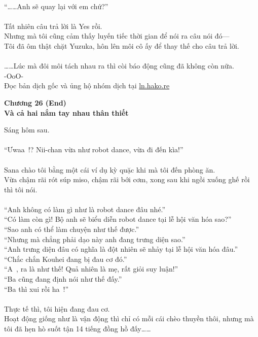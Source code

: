\documentclass[12pt,a4paper, twosides]{book}
\begin{document}
\\
“……Anh sẽ quay lại với em chứ?”\\
\\
Tất nhiên câu trả lời là Yes rồi.\\
Nhưng mà tôi cũng cảm thấy luyến tiếc thời gian để nói ra câu nói đó—\\
Tôi đã ôm thật chặt Yuzuka, hôn lên môi cô ấy để thay thế cho câu trả lời.\\
\\
……Lúc mà đôi môi tách nhau ra thì còi báo động cũng đã không còn nữa.\\
-OoO-\\
Đọc bản dịch gốc và ủng hộ nhóm dịch tại \href{https://ln.hako.re/}{ln.hako.re}\\
\newpage

    \begin{center}
    \textbf{\large Chương 26 (End) \\ Và cả hai nắm tay nhau thân thiết}
    \end{center}
    \noindent
Sáng hôm sau.\\
\\
“Ưwaa~!? Nii-chan vừa như robot dance, vừa đi đến kìa!”\\
\\
Sana chào tôi bằng một cái ví dụ kỳ quặc khi mà tôi đến phòng ăn.\\
Vừa chậm rãi rót súp miso, chậm rãi bới cơm, xong sau khi ngồi xuống ghế rồi thì tôi nói.\\
\\
“Anh không có làm gì như là robot dance đâu nhé.”\\
“Có làm còn gì! Bộ anh sẽ biểu diễn robot dance tại lễ hội văn hóa sao?”\\
“Sao anh có thể làm chuyện như thế được.”\\
“Nhưng mà chẳng phải dạo này anh đang trưng diện sao.”\\
“Anh trưng diện đâu có nghĩa là đột nhiên sẽ nhảy tại lễ hội văn hóa đâu.”\\
“Chắc chắn Kouhei đang bị đau cơ đó.”\\
“A~, ra là như thế! Quả nhiên là mẹ, rất giỏi suy luận!”\\
“Ba cũng đang định nói như thế đấy.”\\
“Ba thì xui rồi ha~!”\\
\\
Thực tế thì, tôi hiện đang đau cơ.\\
Hoạt động giống như là vận động thì chỉ có mỗi cái chèo thuyền thôi, nhưng mà tôi đã hẹn hò suốt tận 14 tiếng đồng hồ đấy……\\
\end{document}
